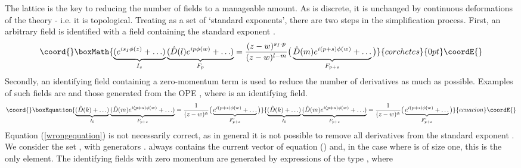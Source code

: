 \documentclass[a4paper,a4paper]{article}
\begin{document}
The lattice \coordHE{} is the key to reducing the number of fields to a manageable amount. As \coordHE{} is discrete, it
is unchanged by continuous deformations of the theory - i.e. it is topological. Treating \coordHE{} as a set of 
`standard exponents', there are two steps in the simplification process.
First, an arbitrary field \coordHE{}
is identified with a field containing the standard exponent \coordHE{}.
\begin{displaymath}\coord{}\boxMath{
\underbrace{(e^{is_I\phi(z)} + \ldots )}_{I_s}\underbrace{(\hat{D}(l)e^{ip\phi(w)} + \ldots)}_{F_p} 
= \frac{(z-w)^{s_I \cdot p}}{(z-w)^{l-m}} \big(\underbrace{\hat{D}(m) e^{i(p+s)\phi(w)} + \ldots}_{F_{p+s}} \big)
}{corchetes}{0pt}\coordE{}\end{displaymath}
Secondly, an identifying field containing a zero-momentum term is used to reduce the number of
derivatives as much as possible. Examples of such fields are \coordHE{} and those generated from the OPE \coordHE{},
where \coordHE{} is an identifying field.
\begin{equation}\coord{}\boxEquation{
\label{wrongequation}
\underbrace{(\hat{D}(k) + \ldots )}_{I_0}\underbrace{(\hat{D}(m)e^{i(p+s)\phi(w)} + \ldots)}_{F_{p+s}} 
= \frac{1}{(z-w)^{\alpha}} \big(\underbrace{e^{i(p+s)\phi(w)} + \ldots}_{F'_{p+s}} \big) 
}{
\underbrace{(\hat{D}(k) + \ldots )}_{I_0}\underbrace{(\hat{D}(m)e^{i(p+s)\phi(w)} + \ldots)}_{F_{p+s}} 
= \frac{1}{(z-w)^{\alpha}} \big(\underbrace{e^{i(p+s)\phi(w)} + \ldots}_{F'_{p+s}} \big) 
}{ecuacion}\coordE{}\end{equation}
Equation (\ref{wrongequation}) is not necessarily correct, as in general it is not possible to remove all derivatives from the standard exponent \coordHE{}.
We consider the set \coordHE{}, with generators \coordHE{}. \coordHE{} always
contains the \coordHE{} current vector \coordHE{} of equation (\myHighlight{$\ref{qnumber}$}\coordHE{}) and, in the case where \coordHE{} is of size one, this is the only element.
The identifying fields with zero momentum are generated by expressions of the type \coordHE{}, where
\end{document}
